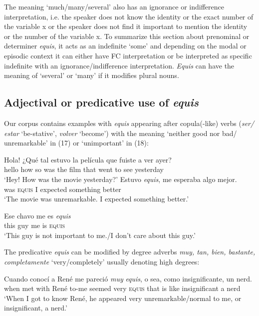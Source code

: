 \documentclass[output=paper
,modfonts
,nonflat]{langsci/langscibook}
\begin{document}
The meaning ‘much/many/several’ also has an ignorance or indifference interpretation, i.e. the speaker does not know the identity or the exact number of the variable x or the speaker does not find it important to mention the identity or the number of the variable x. 
To summarize this section about prenominal or determiner \textit{equis}, it acts as an indefinite ‘some’ and depending on the modal or episodic context it can either have FC interpretation or be interpreted as specific indefinite with an ignorance/indifference interpretation. \textit{Equis} can have the meaning of ‘several’ or ‘many’ if it modifies plural nouns.

\subsection{Adjectival or predicative use of \textit{equis}}\label{sec:kellert:2.2}
Our corpus contains examples with \textit{equis} appearing after copula(-like) verbs (\textit{ser/ estar} ‘be-stative’, \textit{volver} ‘become’) with the meaning ‘neither good nor bad/ unremarkable’ in (17) or ‘unimportant’ in (18):

\ea
\begin{xlist}
Hola! {¿}Qué tal estuvo la película que fuiste a ver ayer?\\
hello how so was the film that went to see yesterday\\
\glt `Hey! How was the movie yesterday?'
\gll  Estuvo \textit{equis}, me esperaba algo mejor.\\
was \textsc{equis} I expected something better\\
\glt `The movie was unremarkable. I expected something better.’
\end{xlist}
\z

\ea
\gll  Ese chavo me es \textit{equis}\\
this guy me is \textsc{equis}\\
\glt ‘This guy is not important to me./I don’t care about this guy.’
\z

The predicative \textit{equis} can be modified by degree adverbs \textit{muy, tan, bien, bastante, completamente} ‘very/completely’ usually denoting high degrees:

\ea
\gll Cuando conocí a René me pareció \textit{muy} \textit{equis}, o sea, como insignificante, un nerd.\\
when met with René to-me seemed very \textsc{equis} that is like insignificant a nerd\\
\glt ‘When I got to know René, he appeared very unremarkable/normal to me, or insignificant, a nerd.’
\z
\end{document}
